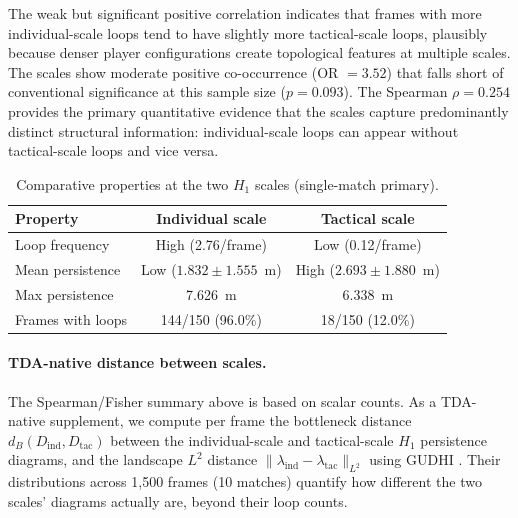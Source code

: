 The weak but significant positive correlation indicates that frames with more individual-scale loops tend to have slightly more tactical-scale loops, plausibly because denser player configurations create topological features at multiple scales. The scales show moderate positive co-occurrence (OR \(=3.52\)) that falls short of conventional significance at this sample size (\(p=0.093\)). The Spearman \(\rho=0.254\) provides the primary quantitative evidence that the scales capture predominantly distinct structural information: individual-scale loops can appear without tactical-scale loops and vice versa.

\begin{table}[H]
  \centering
  \caption{Comparative properties at the two \(H_1\) scales (single-match primary).}
  \label{tab:complement}
  \begin{tabular}{@{}lcc@{}}
    \toprule
    Property & Individual scale & Tactical scale \\
    \midrule
    Loop frequency & High (2.76/frame) & Low (0.12/frame) \\
    Mean persistence & Low (\(1.832\pm1.555\)~m) & High (\(2.693\pm1.880\)~m) \\
    Max persistence & 7.626~m & 6.338~m \\
    Frames with loops & 144/150 (96.0\%) & 18/150 (12.0\%) \\
    \bottomrule
  \end{tabular}
\end{table}

\paragraph{TDA-native distance between scales.} The Spearman/Fisher summary above is based on scalar counts. As a TDA-native supplement, we compute per frame the bottleneck distance \(d_B(D_\mathrm{ind}, D_\mathrm{tac})\) between the individual-scale and tactical-scale \(H_1\) persistence diagrams, and the landscape \(L^2\) distance \(\|\lambda_\mathrm{ind}-\lambda_\mathrm{tac}\|_{L^2}\) \citep{Bubenik2015} using GUDHI \citep{Tauzin2021}. Their distributions across 1{,}500 frames (10 matches) quantify how different the two scales' diagrams actually are, beyond their loop counts.

